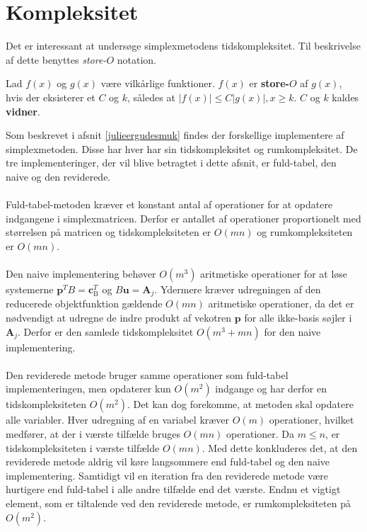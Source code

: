 \section{Kompleksitet}
\label{kompleksitet}
Det er interessant at undersøge simplexmetodens tidskompleksitet.
Til beskrivelse af dette benyttes \textit{store-$O$} notation.
%
\begin{defn}{}{}
Lad $f(x)$ og $g(x)$ være vilkårlige funktioner. $f(x)$ er \textbf{store-$O$} af $g(x)$, hvis der eksisterer et $C$ og $k$, således at $|f(x)| \leq C|g(x)|, x \geq k$. $C$ og $k$ kaldes \textbf{vidner}.
\end{defn}
\noindent
%
Som beskrevet i afsnit \ref{julieergudesmuk} findes der forskellige implementere af simplexmetoden. Disse har  hver har sin tidskompleksitet og rumkompleksitet.
%
De tre implementeringer, der vil blive betragtet i dette afsnit, er fuld-tabel, den naive og den reviderede.\\\\
%
Fuld-tabel-metoden kræver et konstant antal af operationer for at opdatere indgangene i simplexmatricen.
Derfor er antallet af operationer proportionelt med størrelsen på matricen og tidskompleksiteten er $O(mn)$ og rumkompleksiteten er $O(mn)$.\\\\
%
Den naive implementering behøver $O(m^3)$ aritmetiske operationer for at løse systemerne $\mathbf{p}^T B=\mathbf{c}_{\text{B}}^T$ og $B\mathbf{u}=\mathbf{A}_j$.
Ydermere kræver udregningen af den reducerede objektfunktion gældende
$O(mn)$ aritmetiske operationer, da det er nødvendigt at udregne de indre produkt af vekotren $\mathbf{p}$ for alle ikke-basis søjler i $\mathbf{A}_j$.
Derfor er den samlede tidskompleksitet $O(m^3+mn)$ for den naive implementering.\\\\
%
Den reviderede metode bruger samme operationer som fuld-tabel implementeringen, men opdaterer kun $O(m^2)$ indgange og har derfor en tidskompleksiteten $O(m^2)$.
Det kan dog forekomme, at metoden skal opdatere alle variabler.
Hver udregning af en variabel kræver $O(m)$ operationer, hvilket medfører, at der i værste tilfælde bruges $O(mn)$ operationer.
Da $m \leq n$, er tidskompleksiteten i værste tilfælde $O(mn)$.
Med dette konkluderes det, at den reviderede metode aldrig vil køre langsommere end fuld-tabel og den naive implementering.
Samtidigt vil en iteration fra den reviderede metode være hurtigere end fuld-tabel i alle andre tilfælde end det værste.
Endnu et vigtigt element, som er tiltalende ved den reviderede metode, er rumkompleksiteten på $O(m^2)$.
